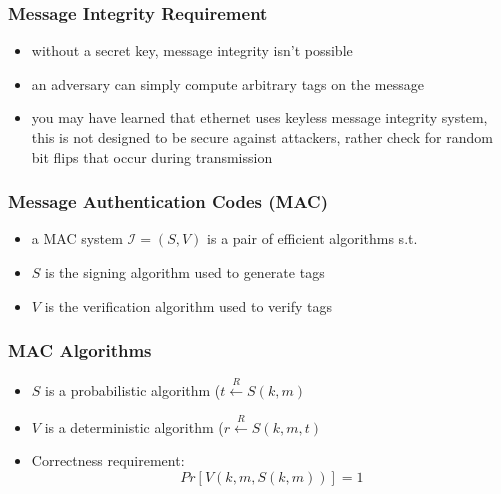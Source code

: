 \documentclass[handout]{beamer}
\begin{document}
\begin{frame}
    \frametitle{Message Integrity Requirement}
    \begin{itemize}
      \item \pause without a secret key, message integrity isn't possible \pause
      \item an adversary can simply compute arbitrary tags on the message \pause
      \item you may have learned that ethernet uses keyless message integrity system, \pause this is not designed to be secure against attackers, rather check for random bit flips that occur during transmission
    \end{itemize}
\end{frame}

\begin{frame}
    \frametitle{Message Authentication Codes (MAC)}
    \begin{itemize}
      \item \pause a MAC system \( \mathcal{I} = (S, V)\) is a pair of efficient algorithms s.t. \pause
      \item \(S\) is the signing algorithm used to generate tags \pause
      \item \(V\) is the verification algorithm used to verify tags
    \end{itemize}
\end{frame}

\begin{frame}
    \frametitle{MAC Algorithms}
    \begin{itemize}
      \item \pause \(S\) is a probabilistic algorithm (\(t \xleftarrow{R} S(k,m)\) \pause
      \item \pause \(V\) is a deterministic algorithm (\(r \xleftarrow{R} S(k,m,t)\) \pause
      \item Correctness requirement: \[Pr[V(k,m, S(k,m))] = 1 \]
    \end{itemize}
\end{frame}
\end{document}
